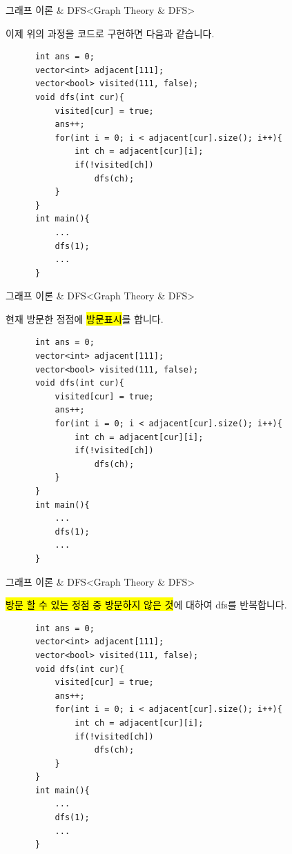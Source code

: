 \begin{frame}[fragile]{그래프 이론 \& DFS}{<Graph Theory \& DFS>}
  \begin{twocol}
    \vspace{18mm}
    이제 위의 과정을 코드로 구현하면 다음과 같습니다.
  \colsplit
    \begin{verbatim}
      int ans = 0;
      vector<int> adjacent[111];
      vector<bool> visited(111, false);
      void dfs(int cur){
          visited[cur] = true;
          ans++;
          for(int i = 0; i < adjacent[cur].size(); i++){
              int ch = adjacent[cur][i];
              if(!visited[ch])
                  dfs(ch);
          }
      }
      int main(){
          ...
          dfs(1);
          ...
      }
    \end{verbatim}
  \end{twocol}
\end{frame}

\begin{frame}[fragile]{그래프 이론 \& DFS}{<Graph Theory \& DFS>}
  \begin{twocol}
    \vspace{18mm}
    현재 방문한 정점에 \hl{방문표시}를 합니다.
  \colsplit
    \begin{verbatim}
      int ans = 0;
      vector<int> adjacent[111];
      vector<bool> visited(111, false);
      void dfs(int cur){
          visited[cur] = true;
          ans++;
          for(int i = 0; i < adjacent[cur].size(); i++){
              int ch = adjacent[cur][i];
              if(!visited[ch])
                  dfs(ch);
          }
      }
      int main(){
          ...
          dfs(1);
          ...
      }
    \end{verbatim}
  \end{twocol}
\end{frame}

\begin{frame}[fragile]{그래프 이론 \& DFS}{<Graph Theory \& DFS>}
  \begin{twocol}
    \vspace{14mm}
    \hl{방문 할 수 있는 정점 중 방문하지 않은 것}에 대하여 dfs를 반복합니다.
    \par\vspace{22mm}
  \colsplit
    \begin{verbatim}
      int ans = 0;
      vector<int> adjacent[111];
      vector<bool> visited(111, false);
      void dfs(int cur){
          visited[cur] = true;
          ans++;
          for(int i = 0; i < adjacent[cur].size(); i++){
              int ch = adjacent[cur][i];
              if(!visited[ch])
                  dfs(ch);
          }
      }
      int main(){
          ...
          dfs(1);
          ...
      }
    \end{verbatim}
  \end{twocol}
\end{frame}


